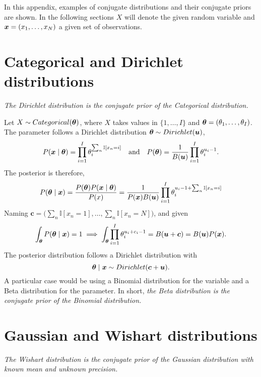 In this appendix, examples of conjugate distributions and their conjugate priors are shown. In the following sections \(X\) will denote the given random variable and \(\bm{x} = (x_{1},\dots,x_{N})\) a given set of observations.

\section*{Categorical and Dirichlet distributions}\label{ap:C-D}

\emph{The Dirichlet distribution is the conjugate prior of the Categorical distribution.}

Let \(X \sim Categorical(\bm{\theta})\), where \(X\) takes values in \(\{1,\dots,I\}\) and \(\bm{\theta} = (\theta_{1},\dots,\theta_{I})\). The parameter follows a Dirichlet distribution \(\bm{\theta} \sim Dirichlet(\bm{u})\),
\[
  P(\bm{x} \mid \bm{\theta}) = \prod_{i=1}^{I}\theta_{i}^{\sum_{n} \mathbb{I}[x_{n}=i]} \quad \text{and} \quad P(\bm{\theta}) = \frac{1}{B(\bm{u})}\prod_{i=1}^{I}\theta_{i}^{u_{i}-1}.
\]
The posterior is therefore,
\[
  P(\bm{\theta} \mid \bm{x}) = \frac{P(\bm{\theta})P(\bm{x} \mid \bm{\theta})}{P(x)} = \frac{1}{P(\bm{x})B(\bm{u})}\prod_{i=1}^{I}\theta_{i}^{u_{i}-1 + \sum_{n} \mathbb{I}[x_{n}=i]}
\]
Naming \(\bm{c} = \big(\sum_{n}\mathbb{I}[x_{n}=1], \dots, \sum_{n}\mathbb{I}[x_{n}=N]\big)\),
and given
\[
  \int_{\bm{\theta}}P(\bm{\theta} \mid \bm{x}) = 1 \implies \int_{\bm{\theta}}\prod_{i=1}^{I}\theta_{i}^{u_{i} + c_{i} - 1} = B(\bm{u} + \bm{c}) = B(\bm{u})P(\bm{x}).
\]
The posterior distribution follows a Dirichlet distribution with
\[
  \bm{\theta} \mid \bm{x} \sim Dirichlet(\bm{c} + \bm{u}).
\]
A particular case would be using a Binomial distribution for the variable and a Beta distribution for the parameter. In short, \emph{the Beta distribution is the conjugate prior of the Binomial distribution.}

\section*{Gaussian and Wishart distributions}

\emph{The Wishart distribution is the conjugate prior of the Gaussian distribution with known mean and unknown precision.}

